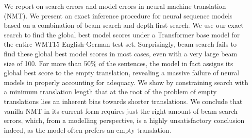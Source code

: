 We report on search errors and model errors in neural machine translation (NMT). We present an exact inference procedure for neural sequence models based on a combination of beam search and depth-first search. We use our exact search to find the global best model scores under a Transformer base model for the entire WMT15 English-German test set. Surprisingly, beam search fails to find these global best model scores in most cases, even with a very large beam size of 100. For more than 50\% of the sentences, the model in fact assigns its global best score to the empty translation, revealing a massive failure of neural models in properly accounting for adequacy. We show by constraining search with a minimum translation length that at the root of the problem of empty translations lies an inherent bias towards shorter translations. We conclude that vanilla NMT in its current form requires just the right amount of beam search errors, which, from a modelling perspective, is a highly unsatisfactory conclusion indeed, as the model often prefers an empty translation.